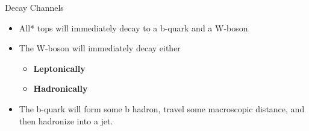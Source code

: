 \documentclass[english,aspectratio=169]{beamer}
\begin{document}
\begin{frame}{Decay Channels}
  \begin{minipage}[c][\textheight]{0.45\textwidth}
    \begin{itemize}
      \item<1-> All* tops will immediately decay to a b-quark and a W-boson
      \item<2-> The W-boson will immediately decay either
        \begin{itemize}
          \item<2,4-> \textbf{Leptonically}
          \item<3-> \textbf{Hadronically}
        \end{itemize}
      \item<4-> The b-quark will form some b hadron, travel some macroscopic distance, and then hadronize into a jet.
    \end{itemize}
  \end{minipage}
  \begin{minipage}[c][\textheight]{0.54\textwidth}
    \centering
\end{minipage}
\end{frame}
\end{document}
